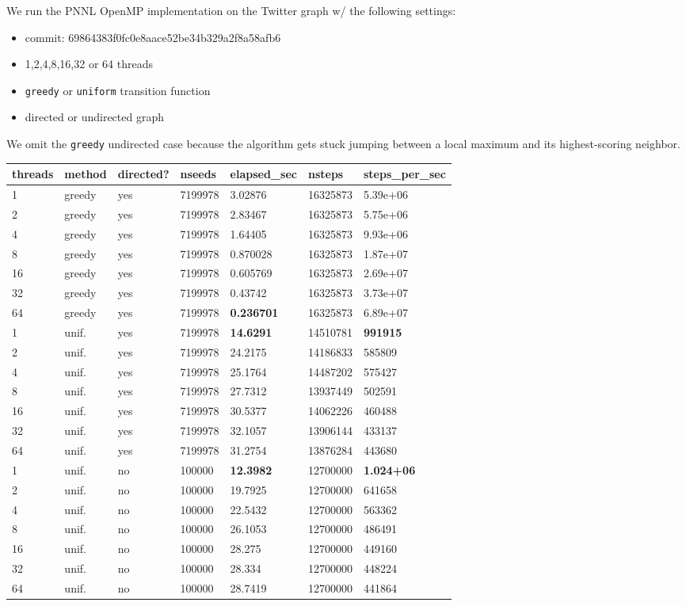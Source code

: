 \documentclass[10pt,oneside]{memoir}
\providecommand{\tightlist}{%
  \setlength{\itemsep}{0pt}\setlength{\parskip}{0pt}}
\begin{document}
We run the PNNL OpenMP implementation on the Twitter graph w/ the
following settings:

\begin{itemize}
\tightlist
\item
  commit: 69864383f0fc0e8aace52be34b329a2f8a58afb6
\item
  1,2,4,8,16,32 or 64 threads
\item
  \texttt{greedy} or \texttt{uniform} transition function
\item
  directed or undirected graph
\end{itemize}

We omit the \texttt{greedy} undirected case because the algorithm gets
stuck jumping between a local maximum and its highest-scoring neighbor.

\begin{longtable}[]{@{}lllllll@{}}
\toprule
threads & method & directed? & nseeds & elapsed\_sec & nsteps &
steps\_per\_sec\tabularnewline
\midrule
\endhead
1 & greedy & yes & 7199978 & 3.02876 & 16325873 &
5.39e+06\tabularnewline
2 & greedy & yes & 7199978 & 2.83467 & 16325873 &
5.75e+06\tabularnewline
4 & greedy & yes & 7199978 & 1.64405 & 16325873 &
9.93e+06\tabularnewline
8 & greedy & yes & 7199978 & 0.870028 & 16325873 &
1.87e+07\tabularnewline
16 & greedy & yes & 7199978 & 0.605769 & 16325873 &
2.69e+07\tabularnewline
32 & greedy & yes & 7199978 & 0.43742 & 16325873 &
3.73e+07\tabularnewline
64 & greedy & yes & 7199978 & \textbf{0.236701} & 16325873 &
6.89e+07\tabularnewline
1 & unif. & yes & 7199978 & \textbf{14.6291} & 14510781 &
\textbf{991915}\tabularnewline
2 & unif. & yes & 7199978 & 24.2175 & 14186833 & 585809\tabularnewline
4 & unif. & yes & 7199978 & 25.1764 & 14487202 & 575427\tabularnewline
8 & unif. & yes & 7199978 & 27.7312 & 13937449 & 502591\tabularnewline
16 & unif. & yes & 7199978 & 30.5377 & 14062226 & 460488\tabularnewline
32 & unif. & yes & 7199978 & 32.1057 & 13906144 & 433137\tabularnewline
64 & unif. & yes & 7199978 & 31.2754 & 13876284 & 443680\tabularnewline
1 & unif. & no & 100000 & \textbf{12.3982} & 12700000 &
\textbf{1.024+06}\tabularnewline
2 & unif. & no & 100000 & 19.7925 & 12700000 & 641658\tabularnewline
4 & unif. & no & 100000 & 22.5432 & 12700000 & 563362\tabularnewline
8 & unif. & no & 100000 & 26.1053 & 12700000 & 486491\tabularnewline
16 & unif. & no & 100000 & 28.275 & 12700000 & 449160\tabularnewline
32 & unif. & no & 100000 & 28.334 & 12700000 & 448224\tabularnewline
64 & unif. & no & 100000 & 28.7419 & 12700000 & 441864\tabularnewline
\bottomrule
\end{longtable}
\end{document}
